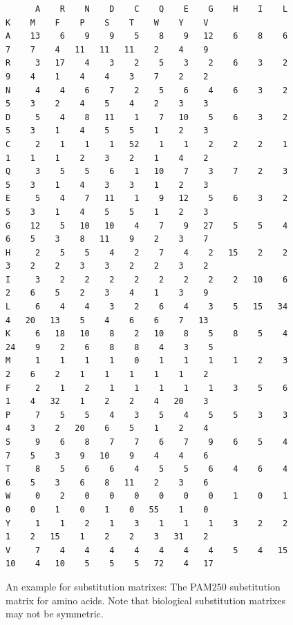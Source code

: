 \begin{figure}
\centering
\scriptsize
\begin{verbatim}
      A    R    N    D    C    Q    E    G    H    I    L    K    M    F    P    S    T    W    Y    V
A    13    6    9    9    5    8    9   12    6    8    6    7    7    4   11   11   11    2    4    9
R     3   17    4    3    2    5    3    2    6    3    2    9    4    1    4    4    3    7    2    2
N     4    4    6    7    2    5    6    4    6    3    2    5    3    2    4    5    4    2    3    3
D     5    4    8   11    1    7   10    5    6    3    2    5    3    1    4    5    5    1    2    3
C     2    1    1    1   52    1    1    2    2    2    1    1    1    1    2    3    2    1    4    2
Q     3    5    5    6    1   10    7    3    7    2    3    5    3    1    4    3    3    1    2    3
E     5    4    7   11    1    9   12    5    6    3    2    5    3    1    4    5    5    1    2    3
G    12    5   10   10    4    7    9   27    5    5    4    6    5    3    8   11    9    2    3    7
H     2    5    5    4    2    7    4    2   15    2    2    3    2    2    3    3    2    2    3    2
I     3    2    2    2    2    2    2    2    2   10    6    2    6    5    2    3    4    1    3    9
L     6    4    4    3    2    6    4    3    5   15   34    4   20   13    5    4    6    6    7   13
K     6   18   10    8    2   10    8    5    8    5    4   24    9    2    6    8    8    4    3    5
M     1    1    1    1    0    1    1    1    1    2    3    2    6    2    1    1    1    1    1    2
F     2    1    2    1    1    1    1    1    3    5    6    1    4   32    1    2    2    4   20    3
P     7    5    5    4    3    5    4    5    5    3    3    4    3    2   20    6    5    1    2    4
S     9    6    8    7    7    6    7    9    6    5    4    7    5    3    9   10    9    4    4    6
T     8    5    6    6    4    5    5    6    4    6    4    6    5    3    6    8   11    2    3    6
W     0    2    0    0    0    0    0    0    1    0    1    0    0    1    0    1    0   55    1    0
Y     1    1    2    1    3    1    1    1    3    2    2    1    2   15    1    2    2    3   31    2
V     7    4    4    4    4    4    4    4    5    4   15   10    4   10    5    5    5   72    4   17
	\end{verbatim}
\normalsize
	\caption{An example for substitution matrixes: The PAM250 substitution matrix for amino acids\cite{dayhoff1978}. Note that biological substitution matrixes may not be symmetric.}
	\label{fig:submatexample}
\end{figure}
